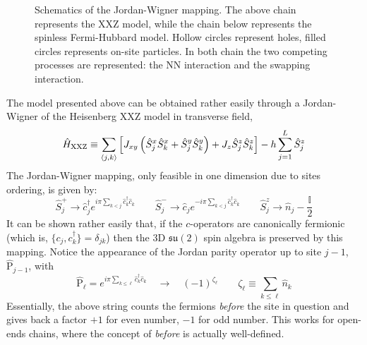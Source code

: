 \begin{figure}
	\centering
	
	\caption{Schematics of the Jordan-Wigner mapping. The above chain represents the $\mathrm{XXZ}$ model, while the chain below represents the spinless Fermi-Hubbard model. Hollow circles represent holes, filled circles represents on-site particles. In both chain the two competing processes are represented: the NN interaction and the swapping interaction.}
	\label{fig:jordan-wigner-mapping}
\end{figure}

The model presented above can be obtained rather easily through a Jordan-Wigner of the Heisenberg XXZ model in transverse field,
\begin{equation}\label{eq:xxz-hamiltonian}
	\hat H_\mathrm{XXZ} \equiv \sum_{\ev{j,k}} \left[
		J_{xy} \left( 
			\hat S_j^x \hat S_k^x + \hat S_j^y \hat S_k^y
		\right) + J_z \hat S_j^z \hat S_k^z
	\right] - h \sum_{j=1}^L \hat S_j^z 
\end{equation}
The Jordan-Wigner mapping, only feasible in one dimension due to sites ordering, is given by:
\[
	\hat S_j^+ \to \hat c_j^\dagger e^{i\pi \sum_{k < j} \hat c_k^\dagger \hat c_k}
	\qquad
	\hat S_j^- \to \hat c_j e^{- i\pi \sum_{k < j} \hat c_k^\dagger \hat c_k}
	\qquad
	\hat S_j^z \to \hat n_j - \frac{\mathbb{I}}{2}
\]
It can be shown rather easily that, if the $c$-operators are canonically fermionic (which is, $\lbrace c_j, c_k^\dagger \rbrace = \delta_{jk}$) then the $3$D $\mathfrak{su}(2)$ spin algebra is preserved by this mapping. Notice the appearance of the Jordan parity operator up to site $j-1$, $\hat{\mathrm{P}}_{j-1}$, with
\[
	\hat{\mathrm{P}}_\ell = e^{i\pi \sum_{k \le \ell} \hat c_k^\dagger \hat c_k}
	\quad\to\quad
	(-1)^{\zeta_\ell}
	\qquad
	\zeta_\ell \equiv \sum_{k \le \ell} \hat n_k
\]
Essentially, the above string counts the fermions \textit{before} the site in question and gives back a factor $+1$ for even number, $-1$ for odd number. This works for open-ends chains, where the concept of \textit{before} is actually well-defined. 

